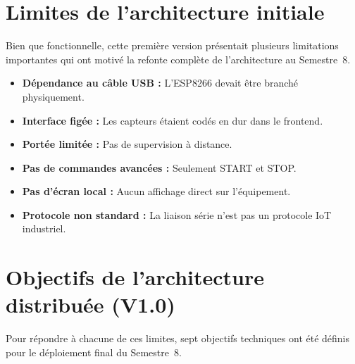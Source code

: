 \documentclass[12pt, a4paper]{report}
\begin{document}
\section{Limites de l'architecture initiale}

Bien que fonctionnelle, cette premi\`ere version pr\'esentait
plusieurs limitations importantes qui ont motiv\'e la refonte
compl\`ete de l'architecture au Semestre~8.

\begin{warningbox}
\begin{itemize}[leftmargin=0.8cm, itemsep=4pt]
  \item[\ding{55}] \textbf{D\'ependance au c\^able USB :}
        L'ESP8266 devait \^etre branch\'e physiquement.
  \item[\ding{55}] \textbf{Interface fig\'ee :}
        Les capteurs \'etaient cod\'es en dur dans le frontend.
  \item[\ding{55}] \textbf{Port\'ee limit\'ee :}
        Pas de supervision \`a distance.
  \item[\ding{55}] \textbf{Pas de commandes avanc\'ees :}
        Seulement START et STOP.
  \item[\ding{55}] \textbf{Pas d'\'ecran local :}
        Aucun affichage direct sur l'\'equipement.
  \item[\ding{55}] \textbf{Protocole non standard :}
        La liaison s\'erie n'est pas un protocole IoT industriel.
\end{itemize}
\end{warningbox}

\section{Objectifs de l'architecture distribu\'ee (V1.0)}

Pour r\'epondre \`a chacune de ces limites, sept objectifs techniques
ont \'et\'e d\'efinis pour le d\'eploiement final du Semestre~8.
\end{document}
